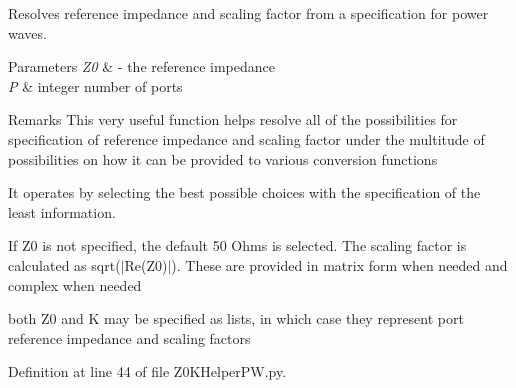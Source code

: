 Resolves reference impedance and scaling factor from a specification for power waves. 


\begin{DoxyParams}{Parameters}
{\em Z0} & -\/ the reference impedance \\
\hline
{\em P} & integer number of ports \\
\hline
\end{DoxyParams}
\begin{DoxyRemark}{Remarks}
This very useful function helps resolve all of the possibilities for specification of reference impedance and scaling factor under the multitude of possibilities on how it can be provided to various conversion functions
\end{DoxyRemark}
It operates by selecting the best possible choices with the specification of the least information.

If Z0 is not specified, the default 50 Ohms is selected. The scaling factor is calculated as sqrt($\vert$\+Re(Z0)$\vert$). These are provided in matrix form when needed and complex when needed

both Z0 and K may be specified as lists, in which case they represent port reference impedance and scaling factors 

Definition at line 44 of file Z0\+K\+Helper\+P\+W.\+py.


